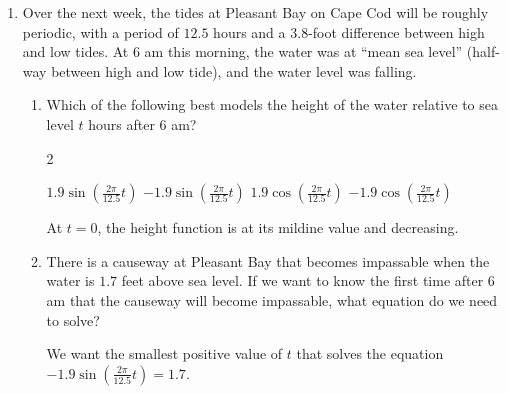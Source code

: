 \documentclass[main]{subfiles}
\begin{document}
\begin{enumerate}
\item 

  Over the next week, the tides at Pleasant Bay on Cape Cod will be
  roughly periodic, with a period of $12.5$ hours and a $3.8$-foot
  difference between high and low tides.  At 6 am this morning, the water
  was at ``mean sea level'' (half-way between high and low tide), and the
  water level was falling.
  \begin{enumerate}
  \item Which of the following best models the height of the water
    relative to sea level $t$ hours after 6 am?

      \begin{multicols}{2}
      \begin{enumerate}[topsep=0pt,label=\protect\maybecircle{\Alph*.}]
      \plainitem $\displaystyle 1.9 \sin \left(\frac{2\pi}{12.5} t \right)$
      \circleitem $\displaystyle -1.9 \sin \left(\frac{2\pi}{12.5} t \right)$
      \plainitem $\displaystyle 1.9 \cos \left(\frac{2\pi}{12.5} t \right)$
      \plainitem $\displaystyle -1.9 \cos \left(\frac{2\pi}{12.5} t \right)$
      \end{enumerate}
      \end{multicols}
    

    \begin{solution}
      At $t = 0$, the height function is at its mildine value and
      decreasing. 
    \end{solution}
\pspace{-12pt}

  \item

    \begin{problem}[0.25in]
      There is a causeway at Pleasant Bay that becomes impassable when
      the water is $1.7$ feet above sea level.
      If we want to know the first time after 6 am that the causeway
      will become impassable, what equation do we need to solve?
    \end{problem}

    \begin{solution}
      We want the smallest positive value of $t$ that solves the equation
      $ -1.9 \sin \left(\frac{2\pi}{12.5} t \right) = 1.7$.
    \end{solution}


\end{enumerate}
\end{enumerate}
\end{document}
